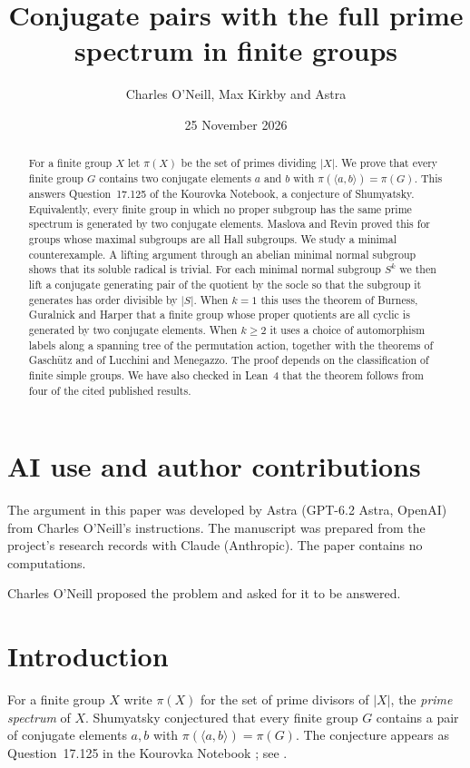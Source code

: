 \documentclass[11pt,colorlinks]{charlie}
\title{Conjugate pairs with the full prime spectrum in finite groups}
\author{Charles O'Neill, Max Kirkby and Astra}
\date{25 November 2026}
\newcommand{\gen}[1]{\langle #1\rangle}
\renewcommand{\aiusestatement}{The argument in this paper was developed by Astra (GPT-6.2 Astra, OpenAI) from Charles O'Neill's instructions. The manuscript was prepared from the project's research records with Claude (Anthropic). The paper contains no computations.}
\begin{document}
\maketitle

\begin{abstract}
For a finite group $X$ let $\pi(X)$ be the set of primes dividing $|X|$. We prove that every finite group $G$ contains two conjugate elements $a$ and $b$ with $\pi(\langle a,b\rangle)=\pi(G)$. This answers Question~17.125 of the Kourovka Notebook, a conjecture of Shumyatsky. Equivalently, every finite group in which no proper subgroup has the same prime spectrum is generated by two conjugate elements. Maslova and Revin proved this for groups whose maximal subgroups are all Hall subgroups. We study a minimal counterexample. A lifting argument through an abelian minimal normal subgroup shows that its soluble radical is trivial. For each minimal normal subgroup $S^k$ we then lift a conjugate generating pair of the quotient by the socle so that the subgroup it generates has order divisible by $|S|$. When $k=1$ this uses the theorem of Burness, Guralnick and Harper that a finite group whose proper quotients are all cyclic is generated by two conjugate elements. When $k\ge2$ it uses a choice of automorphism labels along a spanning tree of the permutation action, together with the theorems of Gasch\"utz and of Lucchini and Menegazzo. The proof depends on the classification of finite simple groups. We have also checked in Lean~4 that the theorem follows from four of the cited published results.
\end{abstract}

\section*{AI use and author contributions}
\aiusestatement

Charles O'Neill proposed the problem and asked for it to be answered. \responsibilitystatement

\section{Introduction}
For a finite group $X$ write $\pi(X)$ for the set of prime divisors of $|X|$, the \emph{prime spectrum} of $X$. Shumyatsky conjectured that every finite group $G$ contains a pair of conjugate elements $a,b$ with $\pi(\gen{a,b})=\pi(G)$. The conjecture appears as Question~17.125 in the Kourovka Notebook \cite{Kourovka}; see \cite{MR13}.
\end{document}
